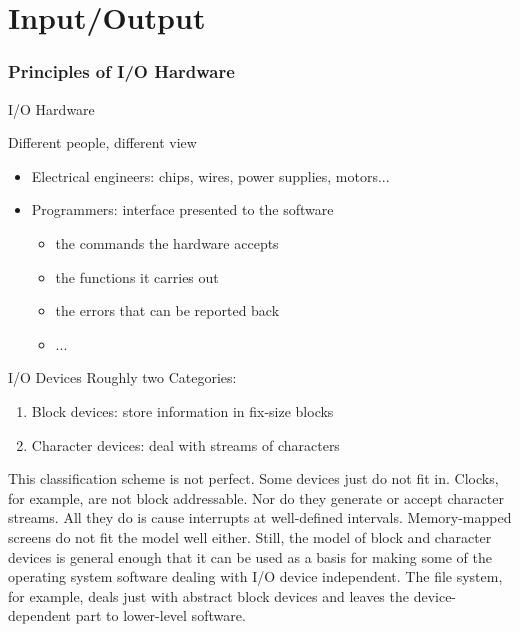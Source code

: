 \mode*
\part{Input/Output}


\section{Principles of I/O Hardware}

\begin{frame}{I/O Hardware}
  \begin{block}{Different people, different view}
    \begin{itemize}
    \item \alert{Electrical engineers:} chips, wires, power supplies, motors...
    \item \alert{Programmers:} interface presented to the software
      \begin{itemize}
      \item the commands the hardware accepts
      \item the functions it carries out
      \item the errors that can be reported back
      \item ...
      \end{itemize}
    \end{itemize}
  \end{block}
\end{frame}

\begin{frame}{I/O Devices}
  Roughly two Categories:
  \begin{enumerate}
  \item \alert{Block devices:} store information in fix-size blocks
  \item \alert{Character devices:} deal with streams of characters
  \end{enumerate}
\end{frame}

This classification scheme is not perfect. Some devices just do not fit in.  Clocks, for
example, are not block addressable. Nor do they generate or accept character streams. All
they do is cause interrupts at well-defined intervals. Memory-mapped screens do not fit
the model well either. Still, the model of block and character devices is general enough
that it can be used as a basis for making some of the operating system software dealing
with I/O device independent. The file system, for example, deals just with abstract block
devices and leaves the device-dependent part to lower-level software.

